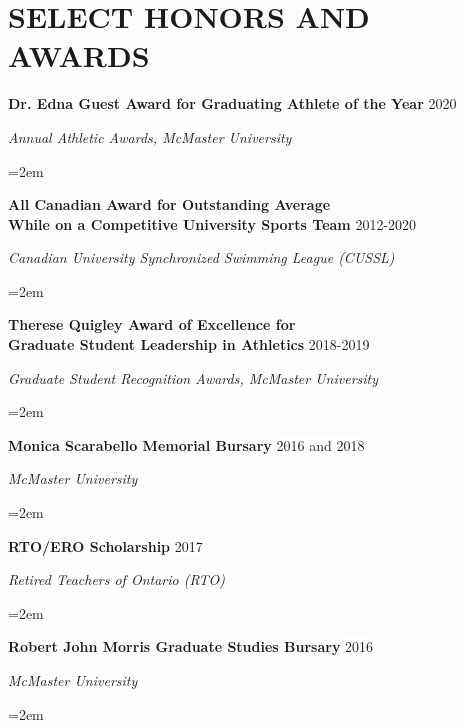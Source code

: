 \documentclass[paper=a4,fontsize=11pt]{scrartcl}	 			%
\newcommand{\NewPart}[1]{\section*{\uppercase{#1}}}
\newcommand{\EducationEntry}[4]{
		\noindent \textbf{#1} \hfill 					%
		\colorbox{White}{%
			\parbox{10em}{%
			\hfill\color{Black}#2}} \par				%
		\noindent \textit{#3} \par					%
		\noindent\hangindent=2em\hangafter=0 \small #4 	%
		\normalsize \par}
\newcommand{\WorkEntry}[4]{						%
		\noindent \textbf{#1} \hfill 					%
		\colorbox{White}{\color{Black}#2} \par		%
		\noindent \textit{#3} \par					%
		\noindent\hangindent=2em\hangafter=0 \small #4 	%
		\normalsize \par}
\newcommand{\WorkEntryB}[3]{						%
	\noindent \textbf{#1} \hfill 					%
	\colorbox{White}{\color{Black}#2} \par		%
	\noindent \textit{#3} \par					%
	\noindent\hangindent=2em\hangafter=0 \small  	%
	\normalsize \par}
\begin{document}

\NewPart{Select Honors and Awards}{}
\WorkEntryB{Dr. Edna Guest Award for Graduating Athlete of the Year}{2020}{Annual Athletic Awards, McMaster University}
\WorkEntryB{All Canadian Award for Outstanding Average \\ While on a Competitive University Sports Team}{2012-2020}{Canadian University Synchronized Swimming League (CUSSL)}
\WorkEntryB{Therese Quigley Award of Excellence for \\ Graduate Student Leadership in Athletics}{2018-2019}{Graduate Student Recognition Awards, McMaster University}
\WorkEntryB{Monica Scarabello Memorial Bursary}{2016 and 2018}{McMaster University}
\WorkEntryB{RTO/ERO Scholarship}{2017}{Retired Teachers of Ontario (RTO)}
\WorkEntryB{Robert John Morris Graduate Studies Bursary}{2016}{McMaster University}
\end{document}
